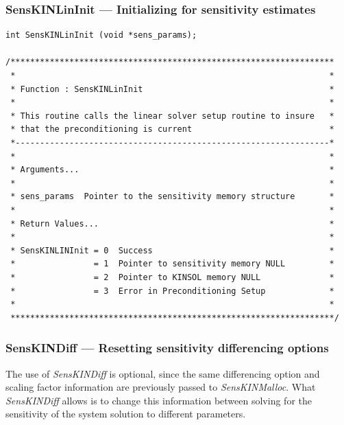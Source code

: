 \documentclass[11pt]{article}
\begin{document}
\subsubsection{SensKINLinInit --- Initializing for sensitivity
estimates}
\small
\begin{verbatim}
int SensKINLinInit (void *sens_params);

/******************************************************************
 *                                                                *
 * Function : SensKINLinInit                                      *
 *                                                                *
 * This routine calls the linear solver setup routine to insure   *
 * that the preconditioning is current                            *
 *----------------------------------------------------------------*
 *                                                                *
 * Arguments...                                                   *
 *                                                                *
 * sens_params  Pointer to the sensitivity memory structure       *
 *                                                                *
 * Return Values...                                               *
 *                                                                *
 * SensKINLINInit = 0  Success                                    *
 *                = 1  Pointer to sensitivity memory NULL         *
 *                = 2  Pointer to KINSOL memory NULL              *
 *                = 3  Error in Preconditioning Setup             *
 *                                                                *
 ******************************************************************/
\end{verbatim}
\normalsize

\subsubsection{SensKINDiff --- Resetting sensitivity differencing
options}

The use of {\em SensKINDiff} is optional, since the same differencing
option and scaling factor information are previously passed to
{\em SensKINMalloc}. What {\em SensKINDiff} allows is to change this
information between solving for the sensitivity of the system solution
to different parameters.
\end{document}
